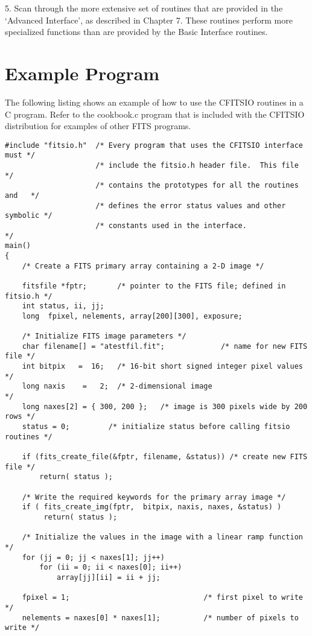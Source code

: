 5.  Scan through the more extensive set of routines that are provided
in the `Advanced Interface', as described in Chapter 7.  These routines
perform more specialized functions than are provided by the Basic
Interface routines.


\section{Example Program}

The following listing shows an example of how to use the CFITSIO
routines in a C program.  Refer to the cookbook.c program that
is included with the CFITSIO distribution for examples of other
FITS programs.


\begin{verbatim}
#include "fitsio.h"  /* Every program that uses the CFITSIO interface must */
                     /* include the fitsio.h header file.  This file       */
                     /* contains the prototypes for all the routines and   */
                     /* defines the error status values and other symbolic */
                     /* constants used in the interface.                   */
main()
{
    /* Create a FITS primary array containing a 2-D image */

    fitsfile *fptr;       /* pointer to the FITS file; defined in fitsio.h */
    int status, ii, jj;
    long  fpixel, nelements, array[200][300], exposure;

    /* Initialize FITS image parameters */
    char filename[] = "atestfil.fit";             /* name for new FITS file */
    int bitpix   =  16;   /* 16-bit short signed integer pixel values       */
    long naxis    =   2;  /* 2-dimensional image                            */
    long naxes[2] = { 300, 200 };   /* image is 300 pixels wide by 200 rows */
    status = 0;         /* initialize status before calling fitsio routines */

    if (fits_create_file(&fptr, filename, &status)) /* create new FITS file */
        return( status );

    /* Write the required keywords for the primary array image */
    if ( fits_create_img(fptr,  bitpix, naxis, naxes, &status) )
         return( status );

    /* Initialize the values in the image with a linear ramp function */
    for (jj = 0; jj < naxes[1]; jj++)
        for (ii = 0; ii < naxes[0]; ii++)
            array[jj][ii] = ii + jj;

    fpixel = 1;                               /* first pixel to write      */
    nelements = naxes[0] * naxes[1];          /* number of pixels to write */


\end{verbatim}

